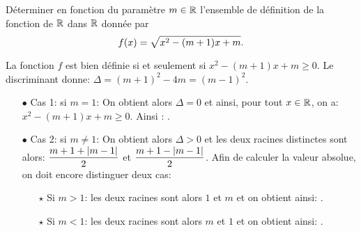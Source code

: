 \documentclass[a4paper, 11pt]{article}
\begin{document}





\begin{exercice}  \;
D\'eterminer en fonction du param\`etre $m\in\mathbb{R}$ l'ensemble de d\'efinition de la fonction de $\mathbb{R}$ dans $\mathbb{R}$ donn\'ee par
$$f(x)=\displaystyle\sqrt{x^2-(m+1)x+m}.$$
\end{exercice}








\begin{correction}  \;
La fonction $f$ est bien d\'efinie si et seulement si $x^2-(m+1)x+m\geq 0$. Le discriminant donne: $\Delta=(m+1)^2-4m=(m-1)^2$.
\begin{itemize}
\item[$\bullet$] Cas 1: si $m=1$: On obtient alors $\Delta=0$ et ainsi, pour tout $x\in\mathbb{R}$, on a: $x^2-(m+1)x+m\geq 0$. Ainsi : . 
\item[$\bullet$] Cas 2: si $m\not= 1$: On obtient alors $\Delta>0$ et les deux racines distinctes sont alors: $\displaystyle\frac{m+1+|m-1|}{2}$ et $\displaystyle\frac{m+1-|m-1|}{2}$. Afin de calculer la valeur absolue, on doit encore distinguer deux cas:
\begin{itemize}
\item[$\star$] Si $m>1$: les deux racines sont alors $1$ et $m$ et on obtient ainsi: .
\item[$\star$] Si $m<1$: les deux racines sont alors $m$ et $1$ et on obtient ainsi: .
\end{itemize}
\end{itemize}
\end{correction}
\end{document}
